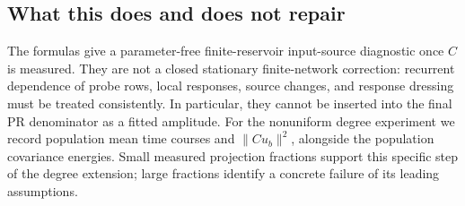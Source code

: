 \subsection{What this does and does not repair}
The formulas give a parameter-free finite-reservoir input-source diagnostic
once $C$ is measured. They are not a closed stationary finite-network
correction: recurrent dependence of probe rows, local responses, source
changes, and response dressing must be treated consistently. In particular,
they cannot be inserted into the final PR denominator as a fitted amplitude.
For the nonuniform degree experiment we record population mean time courses
and $\|Cu_b\|^2$, alongside the population covariance energies. Small measured
projection fractions support this specific step of the degree extension;
large fractions identify a concrete failure of its leading assumptions.
